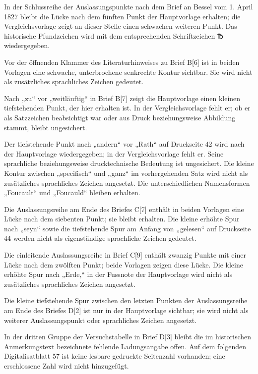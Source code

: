 In der Schlussreihe der Auslassungspunkte nach dem Brief an Bessel vom 1. April 1827 bleibt die Lücke nach dem fünften Punkt der Hauptvorlage erhalten; die Vergleichsvorlage zeigt an dieser Stelle einen schwachen weiteren Punkt. Das historische Pfundzeichen wird mit dem entsprechenden Schriftzeichen {℔} wiedergegeben.

Vor der öffnenden Klammer des Literaturhinweises zu Brief B[6] ist in beiden Vorlagen eine schwache, unterbrochene senkrechte Kontur sichtbar. Sie wird nicht als zusätzliches sprachliches Zeichen gedeutet.

Nach „zu“ vor „weitläuftig“ in Brief B[7] zeigt die Hauptvorlage einen kleinen tiefstehenden Punkt, der hier erhalten ist. In der Vergleichsvorlage fehlt er; ob er als Satzzeichen beabsichtigt war oder aus Druck beziehungsweise Abbildung stammt, bleibt ungesichert.

Der tiefstehende Punkt nach „andern“ vor „Rath“ auf Druckseite 42 wird nach der Hauptvorlage wiedergegeben; in der Vergleichsvorlage fehlt er. Seine sprachliche beziehungsweise drucktechnische Bedeutung ist ungesichert. Die kleine Kontur zwischen „specifisch“ und „ganz“ im vorhergehenden Satz wird nicht als zusätzliches sprachliches Zeichen angesetzt. Die unterschiedlichen Namensformen „Foucault“ und „Foucauld“ bleiben erhalten.

Die Auslassungsreihe am Ende des Briefes C[7] enthält in beiden Vorlagen eine Lücke nach dem siebenten Punkt; sie bleibt erhalten. Die kleine erhöhte Spur nach „seyn“ sowie die tiefstehende Spur am Anfang von „gelesen“ auf Druckseite 44 werden nicht als eigenständige sprachliche Zeichen gedeutet.

Die einleitende Auslassungsreihe in Brief C[9] enthält zwanzig Punkte mit einer Lücke nach dem zwölften Punkt; beide Vorlagen zeigen diese Lücke. Die kleine erhöhte Spur nach „Erde,“ in der Fussnote der Hauptvorlage wird nicht als zusätzliches sprachliches Zeichen angesetzt.

Die kleine tiefstehende Spur zwischen den letzten Punkten der Auslassungsreihe am Ende des Briefes D[2] ist nur in der Hauptvorlage sichtbar; sie wird nicht als weiterer Auslassungspunkt oder sprachliches Zeichen angesetzt.

In der dritten Gruppe der Versuchstabelle in Brief D[3] bleibt die im historischen Anmerkungstext bezeichnete fehlende Ladungsangabe offen. Auf dem folgenden Digitalisatblatt 57 ist keine lesbare gedruckte Seitenzahl vorhanden; eine erschlossene Zahl wird nicht hinzugefügt.

